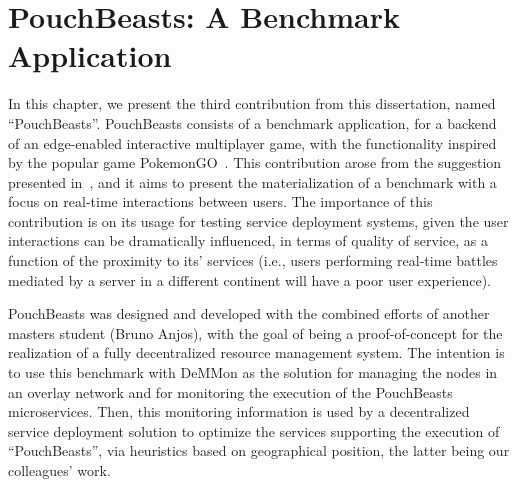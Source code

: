 

\chapter{PouchBeasts: A Benchmark Application}
\label{cha:benchmark}

In this chapter, we present the third contribution from this dissertation, named ``PouchBeasts''. PouchBeasts consists of a benchmark application, for a backend of an edge-enabled interactive multiplayer game, with the functionality inspired by the popular game PokemonGO~\cite{pokemonGo}. This contribution arose from the suggestion presented in~\cite{Leitao2018}, and it aims to present the materialization of a benchmark with a focus on real-time interactions between users. The importance of this contribution is on its usage for testing service deployment systems, given the user interactions can be dramatically influenced, in terms of quality of service, as a function of the proximity to its' services (i.e., users performing real-time battles mediated by a server in a different continent will have a poor user experience).


PouchBeasts was designed and developed with the combined efforts of another masters student (Bruno Anjos), with the goal of being a proof-of-concept for the realization of a fully decentralized resource management system. The intention is to use this benchmark with DeMMon as the solution for managing the nodes in an overlay network and for monitoring the execution of the PouchBeasts microservices. Then, this monitoring information is used by a decentralized service deployment solution to optimize the services supporting the execution of ``PouchBeasts'', via heuristics based on geographical position, the latter being our colleagues' work.

